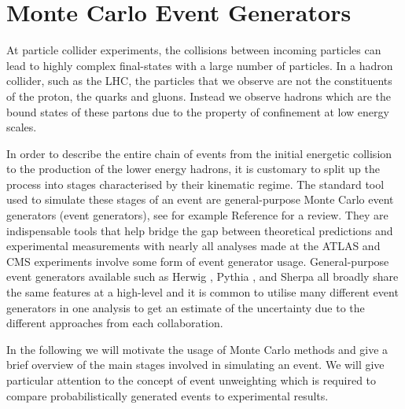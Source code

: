 \documentclass[main.tex]{subfiles}
\begin{document}
\chapter{Monte Carlo Event Generators}\label{chap:MC}
    At particle collider experiments,
    the collisions between incoming particles can lead
    to highly complex final-states with a large number
    of particles. In a hadron collider, such as the LHC,
    the particles that we observe are not the constituents
    of the proton, the quarks and gluons. Instead we observe
    hadrons which are the bound states of these partons
    due to the property of confinement at low energy scales.

    In order to describe the entire chain of events
    from the initial energetic collision to the production
    of the lower energy hadrons, it is customary to
    split up the process into stages characterised by
    their kinematic regime. The standard tool used
    to simulate these stages of an event are general-purpose
    Monte Carlo event generators (event generators), see
    for example Reference \cite{Buckley:2011ms} for a review.
    They are indispensable tools that help
    bridge the gap between theoretical predictions
    and experimental measurements with nearly all
    analyses made at the ATLAS and CMS experiments
    involve some form of event generator usage.
    General-purpose event generators available
    such as Herwig \cite{Bahr:2008pv,Bellm:2015jjp},
    Pythia \cite{Sjostrand:2006za,Bierlich:2022pfr},
    and Sherpa \cite{Gleisberg:2008ta,Sherpa:2019gpd} all broadly share 
    the same features at a high-level and it is common
    to utilise many different event generators
    in one analysis to get an estimate of the uncertainty
    due to the different approaches from each collaboration.

    In the following we will motivate the usage of
    Monte Carlo methods and give a brief overview
    of the main stages involved in simulating an event.
    We will give particular attention to the concept of event
    unweighting which is required to compare probabilistically
    generated events to experimental results.
\end{document}
